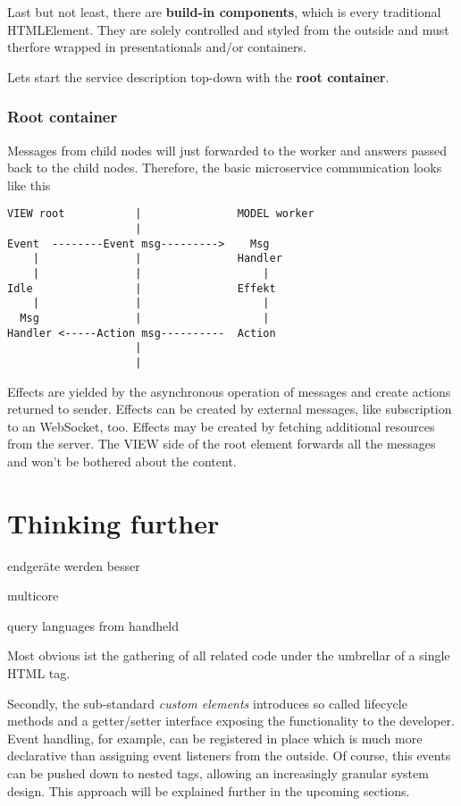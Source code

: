 \documentclass[]{article}
\begin{document}
Last but not least, there are \textbf{build-in components}, which is
every traditional HTMLElement. They are solely controlled and styled
from the outside and must therfore wrapped in presentationals and/or
containers.

Lets start the service description top-down with the \textbf{root
container}.

\subsubsection{Root container}\label{root-container}

Messages from child nodes will just forwarded to the worker and answers
passed back to the child nodes. Therefore, the basic microservice
communication looks like this

\begin{verbatim}
VIEW root           |               MODEL worker
                    |
Event  --------Event msg--------->    Msg
    |               |               Handler
    |               |                   |
Idle                |               Effekt
    |               |                   |
  Msg               |                   |
Handler <-----Action msg----------  Action                                      
                    |                   
                    |
\end{verbatim}

Effects are yielded by the asynchronous operation of messages and create
actions returned to sender. Effects can be created by external messages,
like subscription to an WebSocket, too. Effects may be created by
fetching additional resources from the server. The VIEW side of the root
element forwards all the messages and won't be bothered about the
content.

\section{Thinking further}\label{thinking-further}

endgeräte werden besser

multicore

query languages from handheld

Most obvious ist the gathering of all related code under the umbrellar
of a single HTML tag.

Secondly, the sub-standard \emph{custom elements} introduces so called
lifecycle methods and a getter/setter interface exposing the
functionality to the developer. Event handling, for example, can be
registered in place which is much more declarative than assigning event
listeners from the outside. Of course, this events can be pushed down to
nested tags, allowing an increasingly granular system design. This
approach will be explained further in the upcoming sections.
\end{document}
